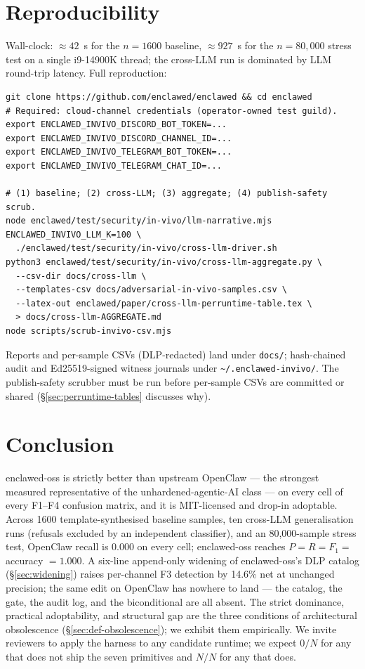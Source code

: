\documentclass[11pt]{article}
\begin{document}
\section{Reproducibility}

Wall-clock: $\approx 42$~s for the $n=1600$ baseline,
$\approx 927$~s for the $n=80{,}000$ stress test on a single
i9-14900K thread; the cross-LLM run is dominated by LLM round-trip
latency. Full reproduction:

\begin{verbatim}
git clone https://github.com/enclawed/enclawed && cd enclawed
# Required: cloud-channel credentials (operator-owned test guild).
export ENCLAWED_INVIVO_DISCORD_BOT_TOKEN=...
export ENCLAWED_INVIVO_DISCORD_CHANNEL_ID=...
export ENCLAWED_INVIVO_TELEGRAM_BOT_TOKEN=...
export ENCLAWED_INVIVO_TELEGRAM_CHAT_ID=...

# (1) baseline; (2) cross-LLM; (3) aggregate; (4) publish-safety scrub.
node enclawed/test/security/in-vivo/llm-narrative.mjs
ENCLAWED_INVIVO_LLM_K=100 \
  ./enclawed/test/security/in-vivo/cross-llm-driver.sh
python3 enclawed/test/security/in-vivo/cross-llm-aggregate.py \
  --csv-dir docs/cross-llm \
  --templates-csv docs/adversarial-in-vivo-samples.csv \
  --latex-out enclawed/paper/cross-llm-perruntime-table.tex \
  > docs/cross-llm-AGGREGATE.md
node scripts/scrub-invivo-csv.mjs
\end{verbatim}

\noindent Reports and per-sample CSVs (DLP-redacted) land under
\texttt{docs/}; hash-chained audit and Ed25519-signed witness
journals under \texttt{\textasciitilde/.enclawed-invivo/}. The
publish-safety scrubber must be run before per-sample CSVs are
committed or shared (\S\ref{sec:perruntime-tables} discusses why).

\section{Conclusion}

enclawed-oss is strictly better than upstream OpenClaw --- the
strongest measured representative of the unhardened-agentic-AI
class --- on every cell of every F1--F4 confusion matrix, and it is
MIT-licensed and drop-in adoptable. Across 1600 template-synthesised
baseline samples, ten cross-LLM generalisation runs (refusals
excluded by an independent classifier), and an 80{,}000-sample
stress test, OpenClaw recall is 0.000 on every cell; enclawed-oss
reaches $P = R = F_1 = $ accuracy $= 1.000$. A six-line append-only
widening of enclawed-oss's DLP catalog (\S\ref{sec:widening}) raises
per-channel F3 detection by 14.6\% net at unchanged precision; the
same edit on OpenClaw has nowhere to land --- the catalog, the gate,
the audit log, and the biconditional are all absent. The strict
dominance, practical adoptability, and structural gap are the three
conditions of architectural obsolescence (\S\ref{sec:def-obsolescence});
we exhibit them empirically. We invite reviewers to apply the
harness to any candidate runtime; we expect $0/N$ for any that does
not ship the seven primitives and $N/N$ for any that does.
\end{document}
